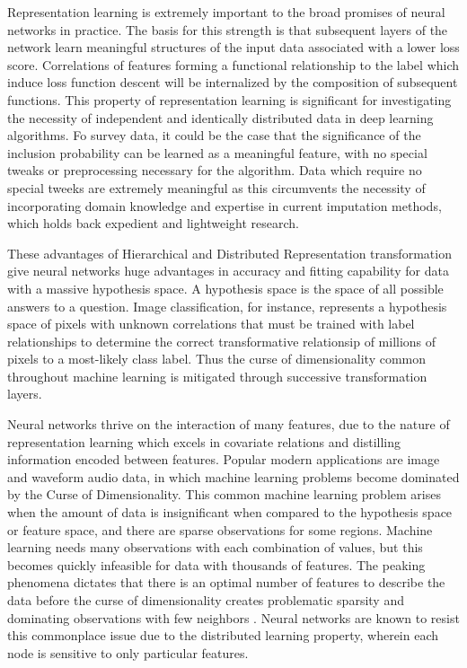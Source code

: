 \documentclass[12pt,twoside]{reedthesis}
\begin{document}
Representation learning is extremely important to the broad promises of
neural networks in practice. The basis for this strength is that
subsequent layers of the network learn meaningful structures of the
input data associated with a lower loss score. Correlations of features
forming a functional relationship to the label which induce loss
function descent will be internalized by the composition of subsequent
functions. This property of representation learning is significant for
investigating the necessity of independent and identically distributed
data in deep learning algorithms. Fo survey data, it could be the case
that the significance of the inclusion probability can be learned as a
meaningful feature, with no special tweaks or preprocessing necessary
for the algorithm. Data which require no special tweeks are extremely
meaningful as this circumvents the necessity of incorporating domain
knowledge and expertise in current imputation methods, which holds back
expedient and lightweight research.

These advantages of Hierarchical and Distributed Representation
transformation give neural networks huge advantages in accuracy and
fitting capability for data with a massive hypothesis space. A
hypothesis space is the space of all possible answers to a question.
Image classification, for instance, represents a hypothesis space of
pixels with unknown correlations that must be trained with label
relationships to determine the correct transformative relationsip of
millions of pixels to a most-likely class label. Thus the curse of
dimensionality common throughout machine learning is mitigated through
successive transformation layers.

Neural networks thrive on the interaction of many features, due to the
nature of representation learning which excels in covariate relations
and distilling information encoded between features. Popular modern
applications are image and waveform audio data, in which machine
learning problems become dominated by the Curse of Dimensionality. This
common machine learning problem arises when the amount of data is
insignificant when compared to the hypothesis space or feature space,
and there are sparse observations for some regions. Machine learning
needs many observations with each combination of values, but this
becomes quickly infeasible for data with thousands of features. The
peaking phenomena dictates that there is an optimal number of features
to describe the data before the curse of dimensionality creates
problematic sparsity and dominating observations with few neighbors .
Neural networks are known to resist this commonplace issue due to the
distributed learning property, wherein each node is sensitive to only
particular features.
\end{document}
